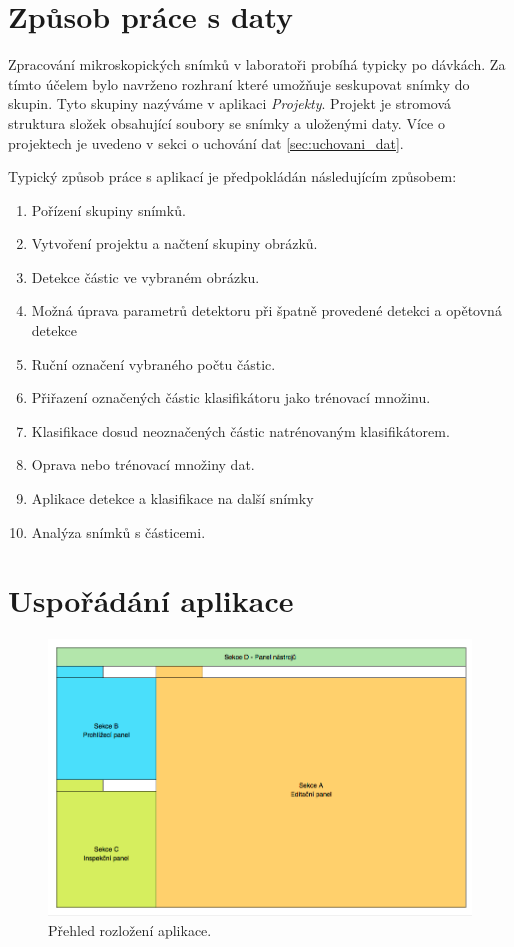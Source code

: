 \documentclass[11pt,twoside,a4paper,table]{book}
\begin{document}
\section{Způsob práce s daty}
Zpracování mikroskopických snímků v laboratoři probíhá typicky po dávkách. Za tímto účelem bylo navrženo rozhraní  které umožňuje seskupovat snímky do skupin. Tyto skupiny nazýváme v aplikaci \textit{Projekty}. Projekt je stromová struktura složek obsahující soubory se snímky a uloženými daty. Více o projektech je uvedeno v sekci o uchování dat \ref{sec:uchovani_dat}.

Typický způsob práce s aplikací je předpokládán následujícím způsobem:
\begin{enumerate}
\item Pořízení skupiny snímků.
\item Vytvoření projektu a načtení skupiny obrázků.
\item Detekce částic ve vybraném obrázku.
\item Možná úprava parametrů detektoru při špatně provedené detekci a opětovná detekce
\item Ruční označení vybraného počtu částic.
\item Přiřazení označených částic klasifikátoru jako trénovací množinu.
\item Klasifikace dosud neoznačených částic natrénovaným klasifikátorem.
\item Oprava nebo trénovací množiny dat.
\item Aplikace detekce a klasifikace na další snímky 
\item Analýza snímků s částicemi.
\end{enumerate}

\section{Uspořádání aplikace}

\begin{figure}
\centering
\includegraphics[scale=0.5]{figures/app_overview.png}
\caption{Přehled rozložení aplikace.}
\label{fig:app_overview}
\end{figure}
\end{document}
